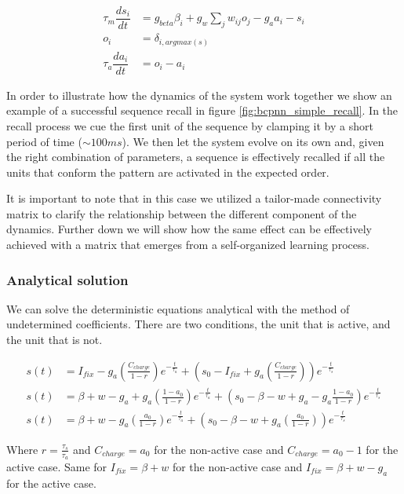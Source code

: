 \documentclass[10pt,a4paper]{article}
\begin{document}
\begin{align}
\tau_m \dfrac{ds_i}{dt} &= g_{beta}\beta_i + g_{w}\sum_{j} w_{ij} o_j  - g_a a_i - s_i \label{eq:simple_bcpnn} \\ 
o_i &=  \delta_{i, argmax(s)} \label{eq:simple_bcpnn_max} \\ 
\tau_a \dfrac{da_i}{dt} &= o_i - a_i \label{eq:simple_bcpnn_adaptation}
\end{align}

In order to illustrate how the dynamics of the system work together we show an example of a successful sequence recall in figure \ref{fig:bcpnn_simple_recall}. In the recall process we cue the first unit of the sequence by clamping it by a short period of time ($\sim 100ms$). We then let the system evolve on its own and, given the right combination of parameters, a sequence is effectively recalled if all the units that conform the pattern are activated in the expected order. 

It is important to note that in this case we utilized a tailor-made connectivity matrix to clarify the relationship between the different component of the dynamics. Further down we will show how the same effect can be effectively achieved with a matrix that emerges from a self-organized learning process.  

\subsubsection{Analytical solution}
We can solve the deterministic equations analytical with the method of undetermined coefficients. There are two conditions, the unit that is active, and the unit that is not. 


\begin{align*} 
s(t) &= I_{fix} - g_a\left(\frac{C_{charge}}{1 - r} \right) e^{-\frac{t}{\tau_a}} + \left(s_0 - I_{fix} + g_a \left( \frac{C_{charge}}{1 - r}\right)\right)e^{-\frac{t}{\tau_s}} \\
s(t) &= \beta + w - g_a + g_a \left(\frac{1 - a_0}{1 - r}\right) e^{-\frac{t}{\tau_a}} + \left(s_0 - \beta - w + g_a - g_a \frac{1 - a_0}{1 - r}\right) e^{-\frac{t}{\tau_s}}  \\ 
s(t) &= \beta + w - g_a \left( \frac{a_0}{1 - r} \right) e^{-\frac{t}{\tau_a}} + \left(s_0 - \beta  - w  + g_a \left( \frac{a_0}{1 - r} \right) \right) e^{-\frac{t}{\tau_s}} 
\end{align*}

Where $r=\frac{\tau_s}{\tau_a}$ and $C_{charge}=a_0$ for the non-active case and $C_{charge} = a_0 - 1$ for the active case. Same for $I_{fix}=\beta + w$ for the non-active case and $I_{fix} = \beta + w - g_a$ for the active case.  
\end{document}
